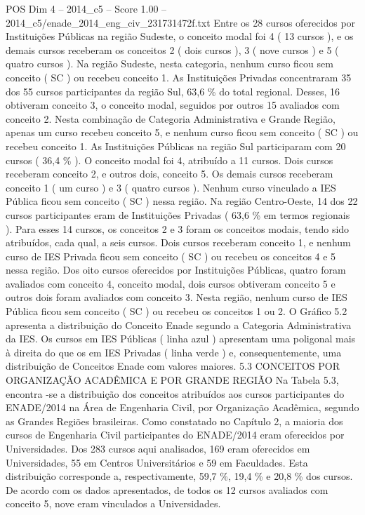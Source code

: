 \begin{textsample}{POS Dim 4 – 2014\_c5 – Score 1.00 – 2014\_c5/enade\_2014\_eng\_civ\_231731472f.txt}
Entre os 28 cursos oferecidos por Instituições Públicas na região Sudeste, o conceito modal foi 4 ( 13 cursos ), e os demais cursos receberam os conceitos 2 ( dois cursos ), 3 ( nove cursos ) e 5 ( quatro cursos ).
Na região Sudeste, nesta categoria, nenhum curso ficou sem conceito ( SC ) ou recebeu conceito 1.
As Instituições Privadas concentraram 35 dos 55 cursos participantes da região Sul, 63,6 \% do total regional.
Desses, 16 obtiveram conceito 3, o conceito modal, seguidos por outros 15 avaliados com conceito 2.
Nesta combinação de Categoria Administrativa e Grande Região, apenas um curso recebeu conceito 5, e nenhum curso ficou sem conceito ( SC ) ou recebeu conceito 1.
As Instituições Públicas na região Sul participaram com 20 cursos ( 36,4 \% ).
O conceito modal foi 4, atribuído a 11 cursos.
Dois cursos receberam conceito 2, e outros dois, conceito 5.
Os demais cursos receberam conceito 1 ( um curso ) e 3 ( quatro cursos ).
Nenhum curso vinculado a IES Pública ficou sem conceito ( SC ) nessa região.
Na região Centro-Oeste, 14 dos 22 cursos participantes eram de Instituições Privadas ( 63,6 \% em termos regionais ).
Para esses 14 cursos, os conceitos 2 e 3 foram os conceitos modais, tendo sido atribuídos, cada qual, a seis cursos.
Dois cursos receberam conceito 1, e nenhum curso de IES Privada ficou sem conceito ( SC ) ou recebeu os conceitos 4 e 5 nessa região.
Dos oito cursos oferecidos por Instituições Públicas, quatro foram avaliados com conceito 4, conceito modal, dois cursos obtiveram conceito 5 e outros dois foram avaliados com conceito 3.
Nesta região, nenhum curso de IES Pública ficou sem conceito ( SC ) ou recebeu os conceitos 1 ou 2.
O Gráfico 5.2 apresenta a distribuição do Conceito Enade segundo a Categoria Administrativa da IES.
Os cursos em IES Públicas ( linha azul ) apresentam uma poligonal mais à direita do que os em IES Privadas ( linha verde ) e, consequentemente, uma distribuição de Conceitos Enade com valores maiores. 5.3 CONCEITOS POR ORGANIZAÇÃO ACADÊMICA E POR GRANDE REGIÃO Na Tabela 5.3, encontra -se a distribuição dos conceitos atribuídos aos cursos participantes do ENADE/2014 na Área de Engenharia Civil, por Organização Acadêmica, segundo as Grandes Regiões brasileiras.
Como constatado no Capítulo 2, a maioria dos cursos de Engenharia Civil participantes do ENADE/2014 eram oferecidos por Universidades.
Dos 283 cursos aqui analisados, 169 eram oferecidos em Universidades, 55 em Centros Universitários e 59 em Faculdades.
Esta distribuição corresponde a, respectivamente, 59,7 \%, 19,4 \% e 20,8 \% dos cursos.
De acordo com os dados apresentados, de todos os 12 cursos avaliados com conceito 5, nove eram vinculados a Universidades.

\end{textsample}
